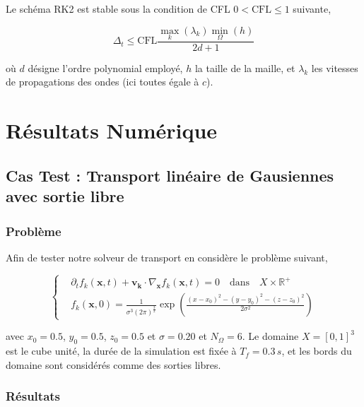 \begin{remark} Le schéma RK2 est stable sous la condition de CFL $0 < \mathrm{CFL} \leq 1$ suivante,

\begin{equation}
\Delta_t \leq \mathrm{CFL} \frac{\max\limits_k(\lambda_k) \min\limits_\Omega (h)}{2d+1}
\end{equation}

où $d$ désigne l'ordre polynomial employé, $h$ la taille de la maille, et $\lambda_k$ les vitesses de propagations des ondes (ici toutes égale à $c$). 
 
 \end{remark}
 \section{Résultats Numérique}
 
 \subsection{Cas Test : Transport linéaire de Gausiennes avec sortie libre}
 
 
 \subsubsection{Problème}
 Afin de tester notre solveur de transport en considère le problème suivant,
  
\begin{equation}
\label{eq:cin0}
\left\{
\begin{aligned}
&\partial_t f_k(\mathbf{x},t) + \mathbf{v_k} \cdot \nabla_{\mathbf{x}}  f_k(\mathbf{x},t) = 0  \quad \mbox{dans} \quad  X \times \mathbb{R}^+\\
&f_k(\mathbf{x},0) = \frac{1}{\sigma^3(2\pi)^{\frac{3}{2}}} \exp \left( \frac{(x-x_0)^2 - (y-y_0)^2 - (z-z_0)^2 }{2\sigma^2}\right)
\end{aligned}
\right.
\end{equation}
 
avec $x_0=0.5$, $y_0=0.5$, $z_0=0.5$ et $\sigma=0.20$ et $N_{\Omega} = 6$. Le domaine $X = [0,1]^3$  est le cube unité, la durée de la simulation est fixée à $T_f=0.3\,s$, et les bords du domaine sont considérés comme des sorties libres. \\

 
 \subsubsection{Résultats}
 
